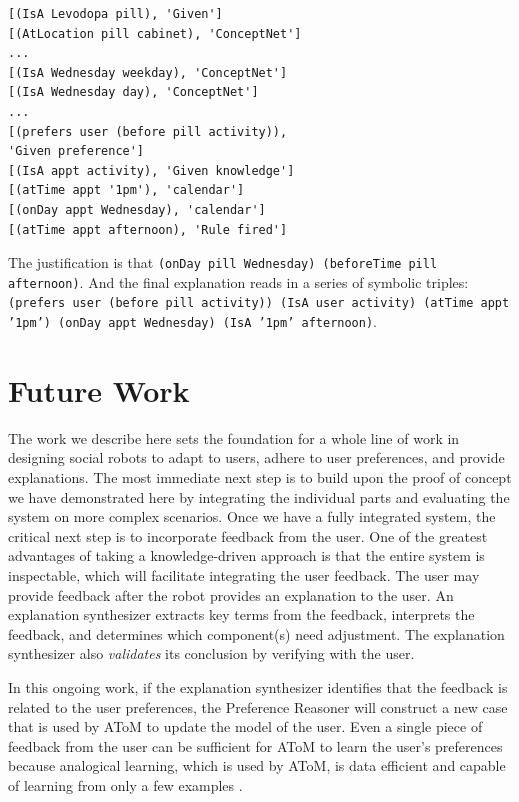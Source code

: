 \documentclass[letterpaper]{article}
\begin{document}
\small{
\begin{verbatim}
[(IsA Levodopa pill), 'Given']
[(AtLocation pill cabinet), 'ConceptNet']
...
[(IsA Wednesday weekday), 'ConceptNet']
[(IsA Wednesday day), 'ConceptNet']
...
[(prefers user (before pill activity)),
'Given preference']
[(IsA appt activity), 'Given knowledge']
[(atTime appt '1pm'), 'calendar']
[(onDay appt Wednesday), 'calendar']
[(atTime appt afternoon), 'Rule fired']
\end{verbatim}}  The justification is that \texttt{(onDay pill Wednesday) (beforeTime pill
afternoon)}.  And the final explanation reads in a series of symbolic
triples: \texttt{(prefers user (before pill activity)) (IsA user activity) (atTime appt '1pm') (onDay appt Wednesday) (IsA '1pm' afternoon)}.

\vspace{-0.76mm}
\section{Future Work}
The work we describe here sets the foundation for a whole line of work in
designing social robots to adapt to users, adhere to user preferences, and
provide explanations.  The most immediate next step is to build upon the
proof of concept we have demonstrated here by integrating the individual
parts and evaluating the system on more complex scenarios.  Once we have a fully integrated system, the critical next step is to
incorporate feedback from the user.
One of the greatest advantages of taking a knowledge-driven approach is
that the entire system is inspectable, which will facilitate integrating
the user feedback.
The user may provide feedback after the robot provides an explanation to
the user.  An explanation synthesizer extracts key terms from the
feedback, interprets the feedback, and determines which component(s)
need adjustment.  The explanation synthesizer also \emph{validates} its
conclusion by verifying with the user.

In this ongoing work, if the explanation synthesizer identifies that the feedback is related
to the user preferences, the Preference Reasoner will construct a new
case that is used by AToM to update the model of the user.  Even a single
piece of feedback from the user can be sufficient for AToM to learn the
user's preferences because analogical learning, which is used by AToM, is
data efficient and capable of learning from only a few examples
\cite{chen2019human,wilson2019analogical}.


\vspace{-0.78mm}
\end{document}
